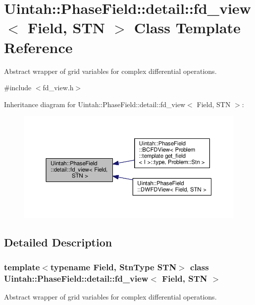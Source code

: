 \hypertarget{classUintah_1_1PhaseField_1_1detail_1_1fd__view}{}\section{Uintah\+:\+:Phase\+Field\+:\+:detail\+:\+:fd\+\_\+view$<$ Field, S\+TN $>$ Class Template Reference}
\label{classUintah_1_1PhaseField_1_1detail_1_1fd__view}


Abstract wrapper of grid variables for complex differential operations.  




{\ttfamily \#include $<$fd\+\_\+view.\+h$>$}



Inheritance diagram for Uintah\+:\+:Phase\+Field\+:\+:detail\+:\+:fd\+\_\+view$<$ Field, S\+TN $>$\+:\nopagebreak
\begin{figure}[H]
\begin{center}
\leavevmode
\includegraphics[width=350pt]{classUintah_1_1PhaseField_1_1detail_1_1fd__view__inherit__graph}
\end{center}
\end{figure}


\subsection{Detailed Description}
\subsubsection*{template$<$typename Field, Stn\+Type S\+TN$>$\newline
class Uintah\+::\+Phase\+Field\+::detail\+::fd\+\_\+view$<$ Field, S\+T\+N $>$}

Abstract wrapper of grid variables for complex differential operations. 

